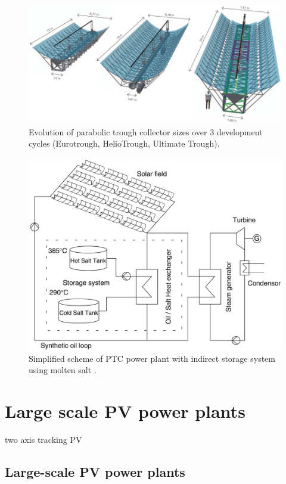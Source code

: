 \pagebreak
\begin{figure}[htbp] 
\centering
\includegraphics[width=1\linewidth]{FIG/Kollektoren}
\caption[Evolution of parabolic trough collector sizes over 3 development cycles (Eurotrough, HelioTrough, Ultimate Trough).]{Evolution of parabolic trough collector sizes over 3 development cycles (Eurotrough, HelioTrough, Ultimate Trough)\cite{Schlaichbergermannundpartner}.}\label{Kollektoren}
\end{figure}


\begin{figure}[htbp]  
\centering
\includegraphics[width=0.45\linewidth]{FIG/troughtindirecttwotank}
\caption[Simplified scheme of PTC power plant with indirect storage system using molten salt.]{Simplified scheme of PTC power plant with indirect storage system using molten salt \cite{Steinmann2012}.}\label{troughtindirecttwotank}
\end{figure}

\pagebreak
\section{Large scale PV power plants}\label{Large scale photo voltaic (PV) power plants}
two axis tracking PV
\subsection{Large-scale PV power plants}

